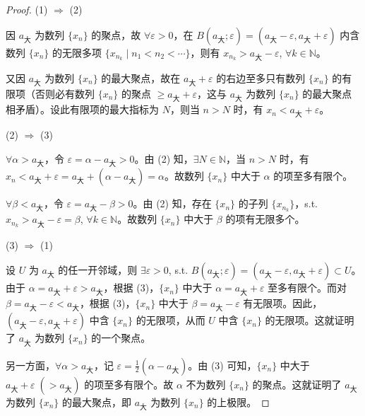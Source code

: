 \begin{proof}
(1) $\Rightarrow$ (2)

因 $a_{\text{大}}$ 为数列 $\{x_n\}$ 的聚点，故 $\forall \varepsilon > 0$，在 $B(a_{\text{大}}; \varepsilon) = (a_{\text{大}} - \varepsilon, a_{\text{大}} + \varepsilon)$ 内含数列 $\{x_n\}$ 的无限多项 $\{x_{n_k} \mid n_1 < n_2 < \cdots\}$，则有 $x_{n_k} > a_{\text{大}} - \varepsilon$, $\forall k \in \mathbb{N}$。

又因 $a_{\text{大}}$ 为数列 $\{x_n\}$ 的最大聚点，故在 $a_{\text{大}} + \varepsilon$ 的右边至多只有数列 $\{x_n\}$ 的有限项（否则必有数列 $\{x_n\}$ 的聚点 $\geqslant a_{\text{大}} + \varepsilon$，这与 $a_{\text{大}}$ 为数列 $\{x_n\}$ 的最大聚点相矛盾）。设此有限项的最大指标为 $N$，则当 $n > N$ 时，有 $x_n < a_{\text{大}} + \varepsilon$。

(2) $\Rightarrow$ (3)

$\forall \alpha > a_{\text{大}}$，令 $\varepsilon = \alpha - a_{\text{大}} > 0$。由 (2) 知，$\exists N \in \mathbb{N}$，当 $n > N$ 时，有 $x_n < a_{\text{大}} + \varepsilon = a_{\text{大}} + (\alpha - a_{\text{大}}) = \alpha$。故数列 $\{x_n\}$ 中大于 $\alpha$ 的项至多有限个。

$\forall \beta < a_{\text{大}}$，令 $\varepsilon = a_{\text{大}} - \beta > 0$。由 (2) 知，存在 $\{x_n\}$ 的子列 $\{x_{n_k}\}$，s.t. $x_{n_k} > a_{\text{大}} - \varepsilon = \beta$, $\forall k \in \mathbb{N}$。故数列 $\{x_n\}$ 中大于 $\beta$ 的项有无限多个。

(3) $\Rightarrow$ (1)

设 $U$ 为 $a_{\text{大}}$ 的任一开邻域，则 $\exists \varepsilon > 0$, s.t. $B(a_{\text{大}}; \varepsilon) = (a_{\text{大}} - \varepsilon, a_{\text{大}} + \varepsilon) \subset U$。由于 $\alpha = a_{\text{大}} + \varepsilon > a_{\text{大}}$，根据 (3)，$\{x_n\}$ 中大于 $\alpha = a_{\text{大}} + \varepsilon$ 至多有限个。而对 $\beta = a_{\text{大}} - \varepsilon < a_{\text{大}}$，根据 (3)，$\{x_n\}$ 中大于 $\beta = a_{\text{大}} - \varepsilon$ 有无限项。因此，$(a_{\text{大}} - \varepsilon, a_{\text{大}} + \varepsilon)$ 中含 $\{x_n\}$ 的无限项，从而 $U$ 中含 $\{x_n\}$ 的无限项。这就证明了 $a_{\text{大}}$ 为数列 $\{x_n\}$ 的一个聚点。

另一方面，$\forall \alpha > a_{\text{大}}$，记 $\varepsilon = \frac{1}{2}(\alpha - a_{\text{大}})$。由 (3) 可知，$\{x_n\}$ 中大于 $a_{\text{大}} + \varepsilon\;(> a_{\text{大}})$ 的项至多有限个。故 $\alpha$ 不为数列 $\{x_n\}$ 的聚点。这就证明了 $a_{\text{大}}$ 为数列 $\{x_n\}$ 的最大聚点，即 $a_{\text{大}}$ 为数列 $\{x_n\}$ 的上极限。
\end{proof}

